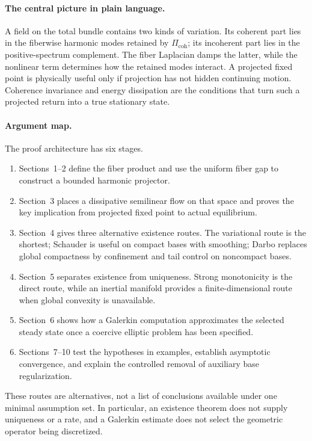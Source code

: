 \documentclass[11pt]{article}
\providecommand{\PiCoh}{\Pi_{\mathrm{coh}}}
\begin{document}
\paragraph{The central picture in plain language.}
A field on the total bundle contains two kinds of variation.  Its coherent
part lies in the fiberwise harmonic modes retained by $\PiCoh$; its
incoherent part lies in the positive-spectrum complement.  The fiber
Laplacian damps the latter, while the nonlinear term determines how the
retained modes interact.  A projected fixed point is physically useful only
if projection has not hidden continuing motion.  Coherence invariance and
energy dissipation are the conditions that turn such a projected return into
a true stationary state.

\paragraph{Argument map.}
The proof architecture has six stages.
\begin{enumerate}[label=\textup{\arabic*.}]
\item Sections~1--2 define the fiber product and use the uniform fiber gap to
construct a bounded harmonic projector.
\item Section~3 places a dissipative semilinear flow on that space and proves
the key implication from projected fixed point to actual equilibrium.
\item Section~4 gives three alternative existence routes.  The variational
route is the shortest; Schauder is useful on compact bases with smoothing;
Darbo replaces global compactness by confinement and tail control on
noncompact bases.
\item Section~5 separates existence from uniqueness.  Strong monotonicity is
the direct route, while an inertial manifold provides a finite-dimensional
route when global convexity is unavailable.
\item Section~6 shows how a Galerkin computation approximates the selected
steady state once a coercive elliptic problem has been specified.
\item Sections~7--10 test the hypotheses in examples, establish asymptotic
convergence, and explain the controlled removal of auxiliary base
regularization.
\end{enumerate}
These routes are alternatives, not a list of conclusions available under one
minimal assumption set.  In particular, an existence theorem does not supply
uniqueness or a rate, and a Galerkin estimate does not select the geometric
operator being discretized.
\end{document}
